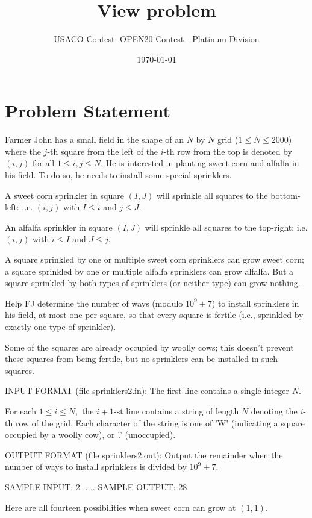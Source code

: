 \documentclass[12pt]{article}
\title{View problem}
\author{USACO Contest: OPEN20 Contest - Platinum Division}
\date{\today}
\begin{document}
\maketitle

\section*{Problem Statement}

Farmer John has a small field in the shape of an $N$ by $N$ grid
($1 \le N \le 2000$) where the $j$-th square from the left of the $i$-th row
from the top is denoted by $(i,j)$ for all $1 \le i,j \le N$. He is interested
in planting sweet corn and alfalfa in his field. To do so, he needs to install
some special sprinklers.

A sweet corn sprinkler in square $(I,J)$ will sprinkle all squares to the
bottom-left: i.e. $(i,j)$ with $I \le i$ and $j \le J$.

An alfalfa sprinkler in square $(I,J)$ will sprinkle all squares to the
top-right: i.e. $(i,j)$ with $i \le I$ and $J \le j$.

A square sprinkled by one or multiple sweet corn sprinklers can grow sweet corn;
a square sprinkled by one or multiple alfalfa sprinklers can grow alfalfa. But a
square sprinkled by both types of sprinklers (or neither type) can grow nothing.

Help FJ determine the number of ways (modulo $10^9 + 7$) to install sprinklers
in his field, at most one per square, so that every square is fertile (i.e.,
sprinkled by exactly one type of sprinkler).

Some of the squares are already occupied by woolly cows; this doesn't prevent
these squares from being fertile, but no sprinklers can be installed in such
squares.

INPUT FORMAT (file sprinklers2.in):
The first line contains a single integer $N.$

For each $1\le i\le N,$ the $i+1$-st line contains a string of length $N$
denoting the $i$-th row of the grid. Each character of the string is one of 'W'
(indicating a square occupied by a woolly cow), or '.' (unoccupied).

OUTPUT FORMAT (file sprinklers2.out):
Output the remainder when the number of ways to install sprinklers is divided by
$10^9+7.$

SAMPLE INPUT:
2
..
..
SAMPLE OUTPUT: 
28

Here are all fourteen possibilities when sweet corn can grow at $(1,1)$.
\end{document}
